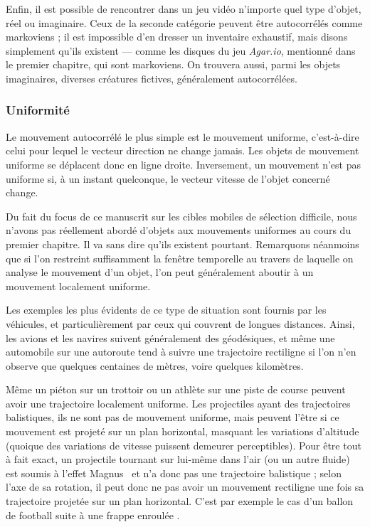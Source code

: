 	Enfin, il est possible de rencontrer dans un jeu vidéo n'importe quel type d'objet, réel ou imaginaire. Ceux de la seconde catégorie peuvent être autocorrélés comme markoviens ; il est impossible d'en dresser un inventaire exhaustif, mais disons simplement qu'ils existent --- comme les disques du jeu \emph{Agar.io}, mentionné dans le premier chapitre, qui sont markoviens. On trouvera aussi, parmi les objets imaginaires, diverses créatures fictives, généralement autocorrélées.

	\FloatBarrier \subsubsection{Uniformité}
	Le mouvement autocorrélé le plus simple est le mouvement uniforme, c'est-à-dire celui pour lequel le vecteur direction ne change jamais. Les objets de mouvement uniforme se déplacent donc en ligne droite. Inversement, un mouvement n'est pas uniforme si, à un instant quelconque, le vecteur vitesse de l'objet concerné change.
	
	Du fait du focus de ce manuscrit sur les cibles mobiles de sélection difficile, nous n'avons pas réellement abordé d'objets aux mouvements uniformes au cours du premier chapitre. Il va sans dire qu'ils existent pourtant. Remarquons néanmoins que si l'on restreint suffisamment la fenêtre temporelle au travers de laquelle on analyse le mouvement d'un objet, l'on peut généralement aboutir à un mouvement localement uniforme.
	
	Les exemples les plus évidents de ce type de situation sont fournis par les véhicules, et particulièrement par ceux qui couvrent de longues distances. Ainsi, les avions et les navires suivent généralement des géodésiques\footnotemark{}, et même une automobile sur une autoroute tend à suivre une trajectoire rectiligne si l'on n'en observe que quelques centaines de mètres, voire quelques kilomètres.
	
	
	Même un piéton sur un trottoir ou un athlète sur une piste de course peuvent avoir une trajectoire localement uniforme. Les projectiles ayant des trajectoires balistiques, ils ne sont pas de mouvement uniforme, mais peuvent l'être si ce mouvement est projeté sur un plan horizontal, masquant les variations d'altitude (quoique des variations de vitesse puissent demeurer perceptibles). Pour être tout à fait exact, un projectile tournant sur lui-même dans l'air (ou un autre fluide) est soumis à l'effet Magnus~\cite{magnus1853ueber, briggs1959effect} et n'a donc pas une trajectoire balistique ; selon l'axe de sa rotation, il peut donc ne pas avoir un mouvement rectiligne une fois sa trajectoire projetée sur un plan horizontal. C'est par exemple le cas d'un ballon de football suite à une \og frappe enroulée \fg{}.

